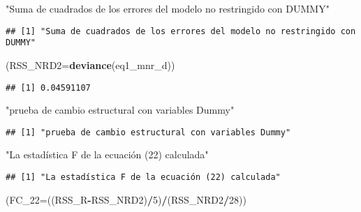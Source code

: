 \documentclass[
]{article}
\newenvironment{Shaded}{\begin{snugshade}}{\end{snugshade}}
\newcommand{\DataTypeTok}[1]{\textcolor[rgb]{0.13,0.29,0.53}{#1}}
\newcommand{\DecValTok}[1]{\textcolor[rgb]{0.00,0.00,0.81}{#1}}
\newcommand{\KeywordTok}[1]{\textcolor[rgb]{0.13,0.29,0.53}{\textbf{#1}}}
\newcommand{\NormalTok}[1]{#1}
\newcommand{\OperatorTok}[1]{\textcolor[rgb]{0.81,0.36,0.00}{\textbf{#1}}}
\newcommand{\StringTok}[1]{\textcolor[rgb]{0.31,0.60,0.02}{#1}}
\begin{document}
\begin{Shaded}
\begin{Highlighting}[]
\StringTok{"Suma de cuadrados de los errores del modelo no restringido con DUMMY"}
\end{Highlighting}
\end{Shaded}

\begin{verbatim}
## [1] "Suma de cuadrados de los errores del modelo no restringido con DUMMY"
\end{verbatim}

\begin{Shaded}
\begin{Highlighting}[]
\NormalTok{(}\DataTypeTok{RSS_NRD2=}\KeywordTok{deviance}\NormalTok{(eq1_mnr_d))}
\end{Highlighting}
\end{Shaded}

\begin{verbatim}
## [1] 0.04591107
\end{verbatim}

\begin{Shaded}
\begin{Highlighting}[]
\StringTok{"prueba de cambio estructural con variables Dummy"}
\end{Highlighting}
\end{Shaded}

\begin{verbatim}
## [1] "prueba de cambio estructural con variables Dummy"
\end{verbatim}

\begin{Shaded}
\begin{Highlighting}[]
\StringTok{"La estadística F de la ecuación (22) calculada"}
\end{Highlighting}
\end{Shaded}

\begin{verbatim}
## [1] "La estadística F de la ecuación (22) calculada"
\end{verbatim}

\begin{Shaded}
\begin{Highlighting}[]
\NormalTok{(}\DataTypeTok{FC_22=}\NormalTok{((RSS_R}\OperatorTok{-}\NormalTok{RSS_NRD2)}\OperatorTok{/}\DecValTok{5}\NormalTok{)}\OperatorTok{/}\NormalTok{(RSS_NRD2}\OperatorTok{/}\DecValTok{28}\NormalTok{))}
\end{Highlighting}
\end{Shaded}
\end{document}
